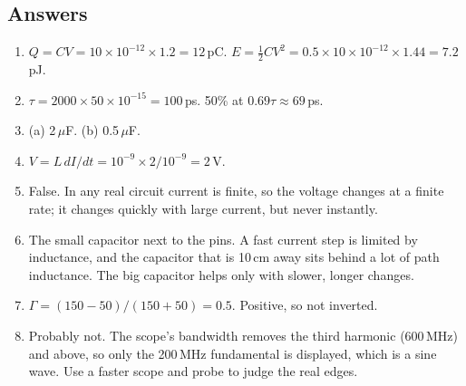 \subsection*{Answers}
\begin{enumerate}
  \item $Q = CV = 10\times10^{-12}\times1.2 = 12$\,pC. $E = \tfrac12CV^2 = 0.5\times10\times10^{-12}\times1.44 = 7.2$\,pJ.
  \item $\tau = 2000 \times 50\times10^{-15} = 100$\,ps. 50\% at $0.69\tau \approx 69$\,ps.
  \item (a) 2\,$\mu$F. (b) 0.5\,$\mu$F.
  \item $V = L\,dI/dt = 10^{-9} \times 2/10^{-9} = 2$\,V.
  \item False. In any real circuit current is finite, so the voltage changes at a finite rate; it changes quickly with large current, but never instantly.
  \item The small capacitor next to the pins. A fast current step is limited by inductance, and the capacitor that is 10\,cm away sits behind a lot of path inductance. The big capacitor helps only with slower, longer changes.
  \item $\Gamma = (150-50)/(150+50) = 0.5$. Positive, so not inverted.
  \item Probably not. The scope's bandwidth removes the third harmonic (600\,MHz) and above, so only the 200\,MHz fundamental is displayed, which is a sine wave. Use a faster scope and probe to judge the real edges.
\end{enumerate}
